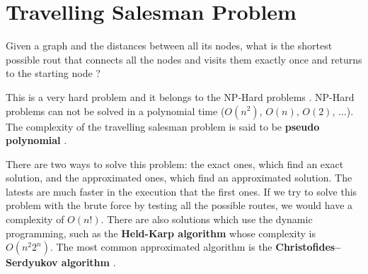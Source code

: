 \section{Travelling Salesman Problem}
Given a graph and the distances between all its nodes, what is the shortest possible rout that connects all the nodes and visits them exactly once and returns to the starting node \cite{wikitravsales}?

This is a very hard problem and it belongs to the NP-Hard problems \cite{wikihphard}. NP-Hard problems can not be solved in a polynomial time (\(O(n^{2})\), \(O(n)\), \(O(2)\), ...). The complexity of the travelling salesman problem is said to be \textbf{pseudo polynomial} \cite{wikipseudo}. 

There are two ways to solve this problem: the exact ones, which find an exact solution, and the approximated ones, which find an approximated solution. The latests are much faster in the execution that the first ones. If we try to solve this problem with the brute force by testing all the possible routes, we would have a complexity of \(O(n!)\). There are also solutions which use the dynamic programming, such as the \textbf{Held-Karp algorithm} whose complexity is \(O(n^{2}2^{n})\). The most common approximated algorithm is the \textbf{Christofides–Serdyukov algorithm} \cite{wikichristofides}.
